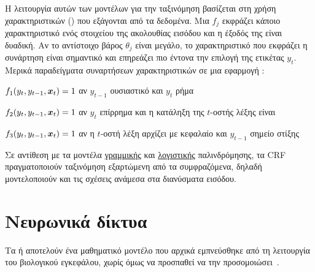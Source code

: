 Η λειτουργία αυτών των μοντέλων για την ταξινόμηση βασίζεται στη χρήση χαρακτηριστικών () που εξάγονται από τα δεδομένα.
Μια  $f_j$ εκφράζει κάποιο χαρακτηριστικό ενός στοιχείου της ακολουθίας εισόδου και η έξοδός της είναι δυαδική.
Αν το αντίστοιχο βάρος $\theta_j$ είναι μεγάλο, το χαρακτηριστικό που εκφράζει η συνάρτηση είναι σημαντικό και επηρεάζει πιο έντονα την επιλογή της ετικέτας $y_t$.
Μερικά παραδείγματα συναρτήσεων χαρακτηριστικών σε μια εφαρμογή :
\begin{compactitem}
    \item $f_1(y_t, y_{t-1}, \vx_t) = 1$ αν $y_{t-1}$ ουσιαστικό και $y_t$ ρήμα
    \item $f_2(y_t, y_{t-1}, \vx_t) = 1$ αν $y_t$ επίρρημα και η κατάληξη της $t$-οστής λέξης είναι 
    \item $f_3(y_t, y_{t-1}, \vx_t) = 1$ αν η $t$-οστή λέξη αρχίζει με κεφαλαίο και $y_{t-1}$ σημείο στίξης
\end{compactitem}

Σε αντίθεση με τα μοντέλα \hyperref[sec:linear-regression]{γραμμικής} και \hyperref[sec:logistic-regression]{λογιστικής} παλινδρόμησης,
τα CRF πραγματοποιούν ταξινόμηση εξαρτώμενη από τα συμφραζόμενα, δηλαδή μοντελοποιούν και τις σχέσεις ανάμεσα στα διανύσματα εισόδου.

\section{Νευρωνικά δίκτυα}\label{sec:neural-networks}
Τα  ή 
αποτελούν ένα μαθηματικό μοντέλο που αρχικά εμπνεύσθηκε από τη λειτουργία του βιολογικού εγκεφάλου, χωρίς όμως να προσπαθεί να την προσομοιώσει~\cite{goodfellow}.

